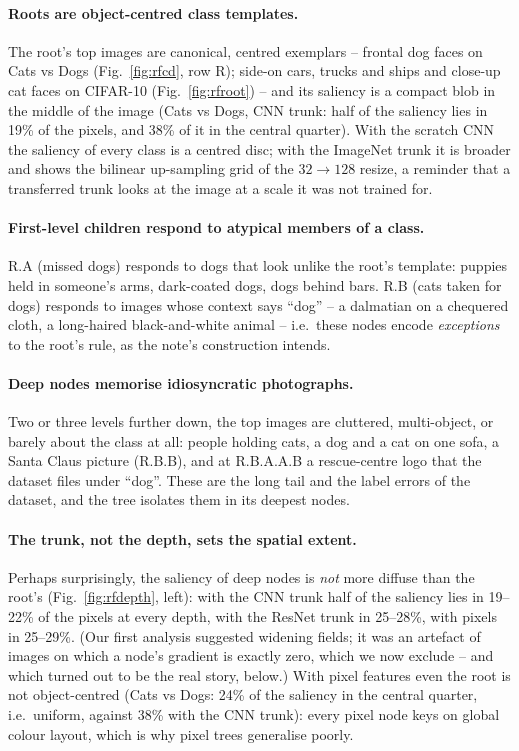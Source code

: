 \paragraph{Roots are object-centred class templates.} The root's top images are canonical, centred
exemplars -- frontal dog faces on Cats vs Dogs (Fig.~\ref{fig:rfcd}, row R); side-on cars, trucks
and ships and close-up cat faces on CIFAR-10 (Fig.~\ref{fig:rfroot}) -- and its saliency is a compact
blob in the middle of the image (Cats vs Dogs, CNN trunk: half of the saliency lies in 19\% of the
pixels, and 38\% of it in the central quarter). With the
scratch CNN the saliency of every class is a centred disc; with the ImageNet trunk it is broader and
shows the bilinear up-sampling grid of the $32\to128$ resize, a reminder that a transferred trunk
looks at the image at a scale it was not trained for.

\paragraph{First-level children respond to atypical members of a class.} R.A (missed dogs) responds
to dogs that look unlike the root's template: puppies held in someone's arms, dark-coated dogs,
dogs behind bars. R.B (cats taken for dogs) responds to images whose context says ``dog'' -- a
dalmatian on a chequered cloth, a long-haired black-and-white animal -- i.e.\ these nodes encode
\emph{exceptions} to the root's rule, as the note's construction intends.

\paragraph{Deep nodes memorise idiosyncratic photographs.} Two or three levels further down, the
top images are cluttered, multi-object, or barely about the class at all: people holding cats, a dog
and a cat on one sofa, a Santa Claus picture (R.B.B), and at R.B.A.A.B a rescue-centre logo that the
dataset files under ``dog''. These are the long tail and the label errors of the dataset, and the tree
isolates them in its deepest nodes.

\paragraph{The trunk, not the depth, sets the spatial extent.} Perhaps surprisingly, the saliency of
deep nodes is \emph{not} more diffuse than the root's (Fig.~\ref{fig:rfdepth}, left): with the CNN trunk
half of the saliency lies in 19--22\% of the pixels at every depth, with the ResNet trunk in 25--28\%,
with pixels in 25--29\%. (Our first analysis suggested widening fields; it was an artefact of images on
which a node's gradient is exactly zero, which we now exclude -- and which turned out to be the real
story, below.) With pixel features even the root is not object-centred (Cats vs Dogs: 24\% of the
saliency in the central quarter, i.e.\ uniform, against 38\% with the CNN trunk): every pixel node keys on
global colour layout, which is why pixel trees generalise poorly.

